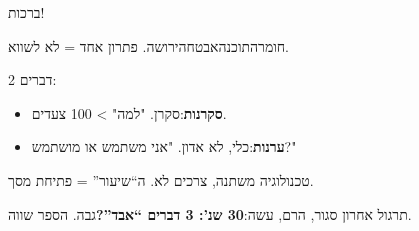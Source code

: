 
ברכות!

חומרהתוכנהאבטחהירושה. פתרון אחד = לא לשווא.

2 דברים:

\begin{itemize}
  \item \textbf{סקרנות}:סקרן. "למה" > 100 צעדים.
  \item \textbf{ערנות}:כלי, לא אדון. "אני משתמש או מושתמש?"
\end{itemize}

טכנולוגיה משתנה, צרכים לא. ה“שיעור” = פתיחת מסך.

\begin{tcbpractice}{תרגול אחרון}
סגור, הרם, עשה:\textbf{30 שנ': 3 דברים “אבד”?}גבה. הספר שווה.

\end{tcbpractice}

